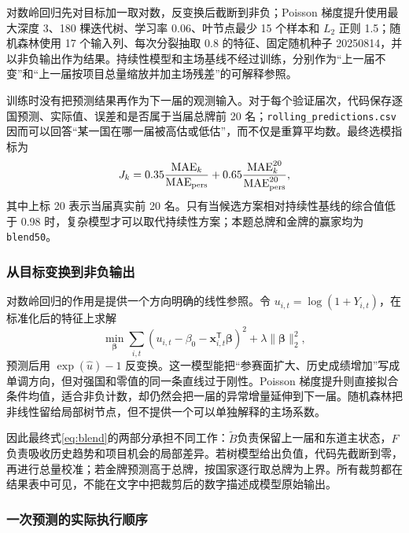 \documentclass[UTF8,11pt,a4paper]{ctexart}
\begin{document}
对数岭回归先对目标加一取对数，反变换后截断到非负；Poisson 梯度提升使用最大深度 3、180 棵迭代树、学习率 0.06、叶节点最少 15 个样本和 $L_2$ 正则 1.5；随机森林使用 17 个输入列、每次分裂抽取 0.8 的特征、固定随机种子 20250814，并以非负输出作为结果。持续性模型和主场基线不经过训练，分别作为“上一届不变”和“上一届按项目总量缩放并加主场残差”的可解释参照。

训练时没有把预测结果再作为下一届的观测输入。对于每个验证届次，代码保存逐国预测、实际值、误差和是否属于当届总牌前 20 名；\texttt{rolling\_predictions.csv}因而可以回答“某一国在哪一届被高估或低估”，而不仅是重算平均数。最终选模指标为
\begin{equation}
J_k=0.35\frac{\operatorname{MAE}_k}{\operatorname{MAE}_{\rm pers}}
 +0.65\frac{\operatorname{MAE}^{20}_k}{\operatorname{MAE}^{20}_{\rm pers}},
\end{equation}
其中上标 20 表示当届真实前 20 名。只有当候选方案相对持续性基线的综合值低于 0.98 时，复杂模型才可以取代持续性方案；本题总牌和金牌的赢家均为 \texttt{blend50}。

\subsubsection{从目标变换到非负输出}

对数岭回归的作用是提供一个方向明确的线性参照。令 $u_{i,t}=\log(1+Y_{i,t})$，在标准化后的特征上求解
\begin{equation}
\min_{\boldsymbol\beta}\sum_{i,t}(u_{i,t}-\beta_0-\boldsymbol{x}_{i,t}^{\mathsf T}\boldsymbol\beta)^2
 +\lambda\|\boldsymbol\beta\|_2^2,
\end{equation}
预测后用 $\exp(\widehat u)-1$ 反变换。这一模型能把“参赛面扩大、历史成绩增加”写成单调方向，但对强国和零值的同一条直线过于刚性。Poisson 梯度提升则直接拟合条件均值，适合非负计数，却仍然会把一届的异常增量延伸到下一届。随机森林把非线性留给局部树节点，但不提供一个可以单独解释的主场系数。

因此最终式\eqref{eq:blend}的两部分承担不同工作：$\widetilde B$负责保留上一届和东道主状态，$F$负责吸收历史趋势和项目机会的局部差异。若树模型给出负值，代码先截断到零，再进行总量校准；若金牌预测高于总牌，按国家逐行取总牌为上界。所有裁剪都在结果表中可见，不能在文字中把裁剪后的数字描述成模型原始输出。

\subsubsection{一次预测的实际执行顺序}
\end{document}
